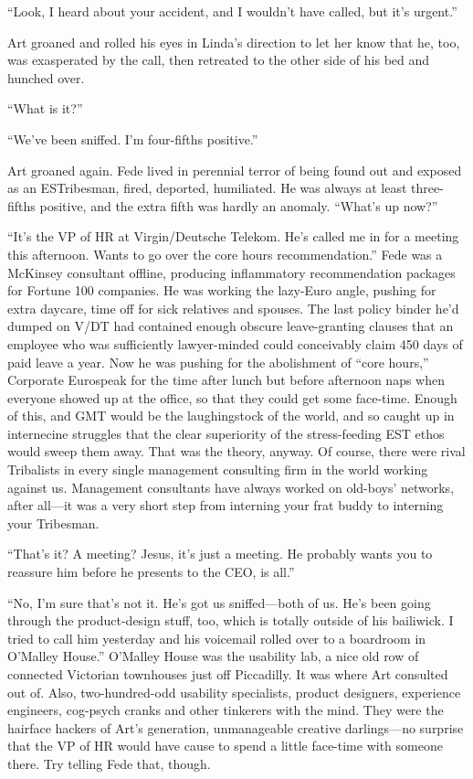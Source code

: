 “Look, I heard about your accident, and I wouldn’t have called, but
it’s urgent.”

Art groaned and rolled his eyes in Linda’s direction to let her
know that he, too, was exasperated by the call, then retreated to
the other side of his bed and hunched over.

“What is it?”

“We’ve been sniffed. I’m four-fifths positive.”

Art groaned again. Fede lived in perennial terror of being found
out and exposed as an ESTribesman, fired, deported, humiliated. He
was always at least three-fifths positive, and the extra fifth was
hardly an anomaly. “What’s up now?”

“It’s the VP of HR at Virgin/Deutsche Telekom. He’s called me in
for a meeting this afternoon. Wants to go over the core hours
recommendation.” Fede was a McKinsey consultant offline, producing
inflammatory recommendation packages for Fortune 100 companies. He
was working the lazy-Euro angle, pushing for extra daycare, time
off for sick relatives and spouses. The last policy binder he’d
dumped on V/DT had contained enough obscure leave-granting clauses
that an employee who was sufficiently lawyer-minded could
conceivably claim 450 days of paid leave a year. Now he was pushing
for the abolishment of “core hours,” Corporate Eurospeak for the
time after lunch but before afternoon naps when everyone showed up
at the office, so that they could get some face-time. Enough of
this, and GMT would be the laughingstock of the world, and so
caught up in internecine struggles that the clear superiority of
the stress-feeding EST ethos would sweep them away. That was the
theory, anyway. Of course, there were rival Tribalists in every
single management consulting firm in the world working against us.
Management consultants have always worked on old-boys’ networks,
after all—it was a very short step from interning your frat buddy
to interning your Tribesman.

“That’s it? A meeting? Jesus, it’s just a meeting. He probably
wants you to reassure him before he presents to the CEO, is all.”

“No, I’m sure that’s not it. He’s got us sniffed—both of us. He’s
been going through the product-design stuff, too, which is totally
outside of his bailiwick. I tried to call him yesterday and his
voicemail rolled over to a boardroom in O’Malley House.” O’Malley
House was the usability lab, a nice old row of connected Victorian
townhouses just off Piccadilly. It was where Art consulted out of.
Also, two-hundred-odd usability specialists, product designers,
experience engineers, cog-psych cranks and other tinkerers with the
mind. They were the hairface hackers of Art’s generation,
unmanageable creative darlings—no surprise that the VP of HR would
have cause to spend a little face-time with someone there. Try
telling Fede that, though.

